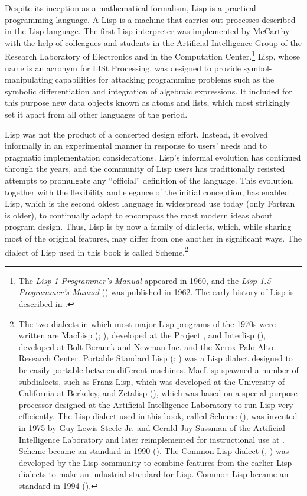 Despite its inception as a mathematical formalism, Lisp is a practical
programming language. A Lisp  is a machine that carries
out processes described in the Lisp language. The first Lisp interpreter was
implemented by McCarthy with the help of colleagues and students in the
Artificial Intelligence Group of the  Research Laboratory of
Electronics and in the  Computation Center.\footnote{The
\textit{Lisp 1 Programmer's Manual} appeared in 1960, and the \textit{Lisp 1.5
Programmer's Manual} () was published in 1962. The early history
of Lisp is described in .} Lisp, whose name is an acronym for
LISt Processing, was designed to provide symbol-manipulating capabilities for
attacking programming problems such as the symbolic differentiation and
integration of algebraic expressions. It included for this purpose new data
objects known as atoms and lists, which most strikingly set it apart from all
other languages of the period.

Lisp was not the product of a concerted design effort. Instead, it evolved
informally in an experimental manner in response to users' needs and to
pragmatic implementation considerations. Lisp's informal evolution has
continued through the years, and the community of Lisp users has traditionally
resisted attempts to promulgate any ``official'' definition of the language.
This evolution, together with the flexibility and elegance of the initial
conception, has enabled Lisp, which is the second oldest language in widespread
use today (only Fortran is older), to continually adapt to encompass the most
modern ideas about program design. Thus, Lisp is by now a family of dialects,
which, while sharing most of the original features, may differ from one another
in significant ways. The dialect of Lisp used in this book is called
Scheme.\footnote{The two dialects in which most major Lisp programs of the
1970s were written are MacLisp (; ), developed at the
 Project , and Interlisp (), developed
at Bolt Beranek and Newman Inc. and the Xerox Palo Alto Research Center.
Portable Standard Lisp (; ) was a Lisp dialect designed to
be easily portable between different machines. MacLisp spawned a number of
subdialects, such as Franz Lisp, which was developed at the University of
California at Berkeley, and Zetalisp (), which was based on a
special-purpose processor designed at the  Artificial Intelligence
Laboratory to run Lisp very efficiently. The Lisp dialect used in this book,
called Scheme (), was invented in 1975 by Guy Lewis Steele Jr. and
Gerald Jay Sussman of the  Artificial Intelligence Laboratory and
later reimplemented for instructional use at . Scheme became an
 standard in 1990 (). The Common Lisp dialect
(, ) was developed by the Lisp community to combine
features from the earlier Lisp dialects to make an industrial standard for
Lisp. Common Lisp became an  standard in 1994 ().}


